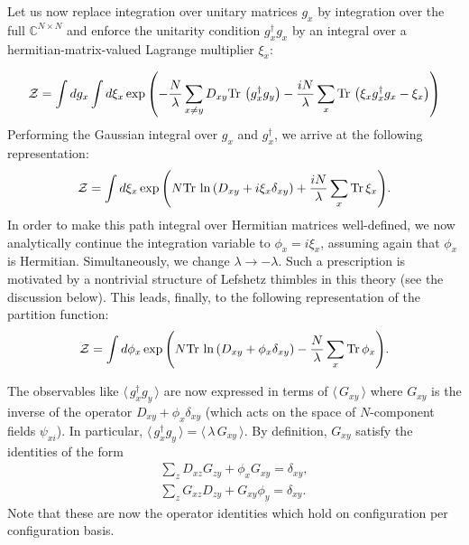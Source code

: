 \documentclass[twocolumn,showpacs,preprintnumbers,superscriptaddress,amsmath,floatfix,amssymb,secnumarabic]{revtex4}
\newcommand{\lr}[1]{ \left( #1 \right) }
\newcommand{\vev}[1]{ \langle \, #1 \, \rangle }
\newcommand{\tr}{ {\rm Tr} \, }
\newcommand{\expa}[1]{ \exp{\left( #1 \right)} }
\begin{document}
Let us now replace integration over unitary matrices $g_x$ by integration over the full $\mathbb{C}^{N \times N}$ and enforce the unitarity condition $g^{\dag}_x g_x$ by an integral over a hermitian-matrix-valued Lagrange multiplier $\xi_x$:
\begin{widetext}
\begin{eqnarray}
\label{sm_partition_matrix_lagrange}
 \mathcal{Z} = \int dg_x \int d\xi_x \expa{ - \frac{N}{\lambda} \sum\limits_{x \neq y} D_{xy} \tr\lr{g^{\dag}_x g_y} - \frac{i N}{\lambda} \sum\limits_x \tr\lr{\xi_x  g^{\dag}_x g_x - \xi_x} }
\end{eqnarray}
Performing the Gaussian integral over $g_x$ and $g^{\dag}_x$, we arrive at the following representation:
\begin{eqnarray}
\label{sm_partition_matrix_lagrange_only_imaginary}
 \mathcal{Z} = \int d\xi_x
 \expa{N \tr\ln\lr{D_{xy} + i \xi_x \delta_{xy}} + \frac{i N}{\lambda} \sum\limits_x \tr \xi_x } .
\end{eqnarray}
In order to make this path integral over Hermitian matrices well-defined, we now analytically continue the integration variable to $\phi_x = i \xi_x$, assuming again that $\phi_x$ is Hermitian. Simultaneously, we change $\lambda \rightarrow -\lambda$. Such a prescription is motivated by a nontrivial structure of Lefshetz thimbles in this theory (see the discussion below). This leads, finally, to the following representation of the partition function:
\begin{eqnarray}
\label{sm_partition_matrix_lagrange_only}
 \mathcal{Z} = \int d\phi_x
 \expa{N \tr\ln\lr{D_{xy} + \phi_x \delta_{xy}} - \frac{N}{\lambda} \sum\limits_x \tr \phi_x } .
\end{eqnarray}
\end{widetext}

 The observables like $\vev{g^{\dag}_x g_y }$ are now expressed in terms of $\vev{G_{xy}}$ where $G_{xy}$ is the inverse of the operator $D_{xy} + \phi_x \delta_{xy}$ (which acts on the space of $N$-component fields $\psi_{x i}$). In particular, $\vev{g^{\dag}_x g_y } = \vev{\lambda \, G_{xy}}$. By definition, $G_{xy}$ satisfy the identities of the form
\begin{eqnarray}
\label{G_identities}
 \sum\limits_z D_{xz} G_{zy} + \phi_x G_{xy} = \delta_{x y} ,
 \nonumber \\
 \sum\limits_z G_{xz} D_{zy} + G_{xy} \phi_y = \delta_{x y} .
\end{eqnarray}
Note that these are now the operator identities which hold on configuration per configuration basis.
\end{document}
